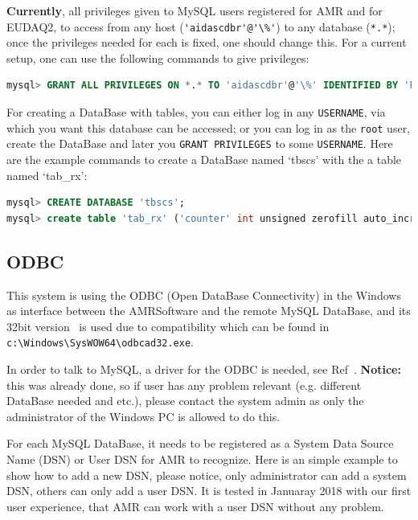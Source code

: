 \documentclass[a4paper,12pt]{scrartcl}
\begin{document}
\textbf{Currently}, all privileges given to MySQL users registered for AMR and for EUDAQ2, to access from any host (\verb|'aidascdbr'@'\%'|) to any database (\verb|*.*|); once the privileges needed for each is fixed, one should change this. For a current setup, one can use the following commands to give privileges:
\begin{lstlisting}[language=SQL]
mysql> GRANT ALL PRIVILEGES ON *.* TO 'aidascdbr'@'\%' IDENTIFIED BY 'PASSWORD';
\end{lstlisting}

For creating a DataBase with tables, you can either log in any \texttt{USERNAME}, via which you want this database can be accessed;
or you can log in as the \verb|root| user, create the DataBase and later you \verb|GRANT PRIVILEGES| to some \verb|USERNAME|.
Here are the example commands to create a DataBase named `tbscs' with the a table named `tab\_rx':
\begin{lstlisting}[language=SQL]
mysql> CREATE DATABASE 'tbscs';
mysql> create table 'tab_rx' ('counter' int unsigned zerofill auto_increment, 'timer' datetime NOT NULL, 'temperature' double);
\end{lstlisting}

\subsection{ODBC}

This system is using the ODBC (Open DataBase Connectivity) in the Windows as interface between the AMRSoftware and the remote MySQL DataBase, and its 32bit version~\cite{odbc} is used due to compatibility which can be found in \verb|c:\Windows\SysWOW64\odbcad32.exe|.

In order to talk to MySQL, a driver for the ODBC is needed, see Ref~\cite{mysql-odbc}. \textbf{Notice:} this was already done, so if user has any problem relevant (e.g. different DataBase needed and etc.), please contact the system admin as only the administrator of the Windows PC is allowed to do this.

For each MySQL DataBase, it needs to be registered as a System Data Source Name (DSN) or User DSN for AMR to recognize. Here is an simple example to show how to add a new DSN, please notice, only administrator can add a system DSN, others can only add a user DSN. It is tested in Januaray 2018 with our first user experience, that AMR can work with a user DSN without any problem.
\end{document}
